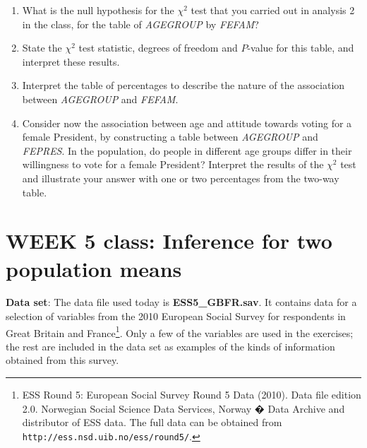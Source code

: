 \begin{enumerate}
\item
What is the null hypothesis for the $\chi^{2}$ test that you carried out
in analysis 2 in the class, for the table of \emph{AGEGROUP} by \emph{FEFAM}?
\item
State the $\chi^{2}$ test statistic, degrees of freedom and $P$-value for this table, and
interpret these results.
\item
Interpret the table of percentages to describe the nature of the association
between \emph{AGEGROUP} and \emph{FEFAM}.
\item
Consider now the association between age and attitude towards
voting for a female President, by constructing a table between
\emph{AGEGROUP} and \emph{FEPRES}. In the population, do people in different
age groups differ in their willingness to vote for a female President?
Interpret the results of the
$\chi^{2}$ test and illustrate your answer with one or two percentages
from the two-way table.
\end{enumerate}


\newpage


\section[Week 5: Comparing two population means]{WEEK 5 class: Inference for two population means}
\textbf{Data set}:
The data file used today is \textbf{ESS5\_GBFR.sav}. It contains
data for a selection of variables from the 2010 European Social Survey
for respondents in Great Britain and France\footnote{ESS Round 5: European Social
Survey Round 5 Data (2010). Data file edition 2.0. Norwegian Social Science Data Services,
Norway � Data Archive and distributor of ESS data. The full data can be
obtained from \texttt{http://ess.nsd.uib.no/ess/round5/}.}. Only a few of the variables are
used in the exercises; the rest are included in the data set as examples
of the kinds of information obtained from this survey.


